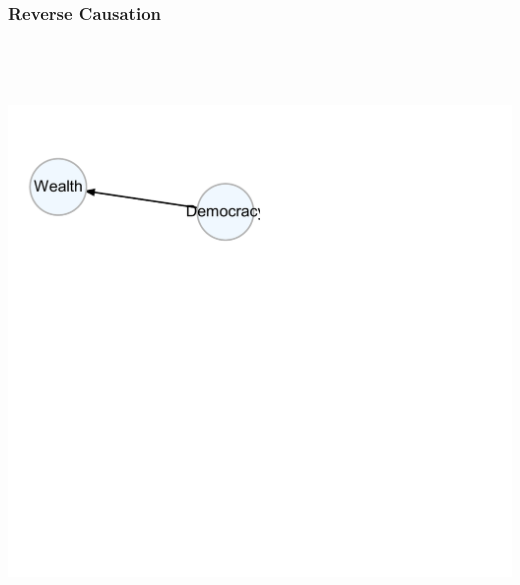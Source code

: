 \documentclass[xcolor=x11names,compress]{beamer}\usepackage[]{graphicx}\usepackage[]{color}
\newenvironment{knitrout}{}{} %
\renewcommand{\(}{\begin{columns}}
\renewcommand{\)}{\end{columns}}
\newcommand{\<}[1]{\begin{column}{#1}}
\renewcommand{\>}{\end{column}}
\begin{document}
\begin{frame}
\frametitle{Reverse Causation}
\begin{knitrout}
\color{fgcolor}

{\centering \includegraphics[width=600,height=600]{figure/unnamed-chunk-4-1} 

}



\end{knitrout}
\end{frame}
\end{document}
